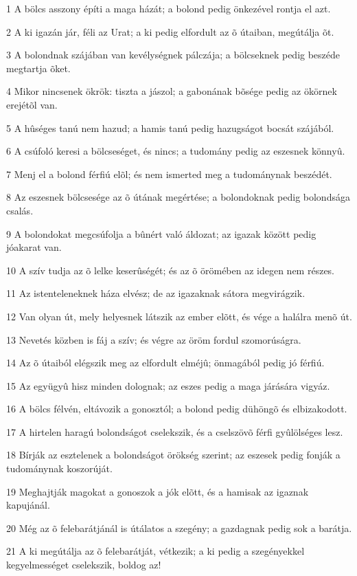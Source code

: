 \par 1 A bölcs asszony építi a maga házát; a bolond pedig önkezével rontja el azt.
\par 2 A ki igazán jár, féli az Urat; a ki pedig elfordult az õ útaiban, megútálja õt.
\par 3 A bolondnak szájában van kevélységnek pálczája; a bölcseknek pedig beszéde megtartja õket.
\par 4 Mikor nincsenek ökrök: tiszta a jászol; a gabonának bõsége pedig az ökörnek erejétõl van.
\par 5 A hûséges tanú nem hazud; a hamis tanú pedig hazugságot bocsát szájából.
\par 6 A csúfoló keresi a bölcseséget, és nincs; a tudomány pedig az eszesnek könnyû.
\par 7 Menj el a bolond férfiú elõl; és nem ismerted meg a tudománynak beszédét.
\par 8 Az eszesnek bölcsesége az õ útának megértése; a bolondoknak pedig bolondsága csalás.
\par 9 A bolondokat megcsúfolja a bûnért való áldozat; az igazak között pedig jóakarat van.
\par 10 A szív tudja az õ lelke keserûségét; és az õ örömében az idegen nem részes.
\par 11 Az istenteleneknek háza elvész; de az igazaknak sátora megvirágzik.
\par 12 Van olyan út, mely helyesnek látszik az ember elõtt, és vége a halálra menõ út.
\par 13 Nevetés közben is fáj a szív; és végre az öröm fordul szomorúságra.
\par 14 Az õ útaiból elégszik meg az elfordult elméjû; önmagából pedig jó férfiú.
\par 15 Az együgyû hisz minden dolognak; az eszes pedig a maga járására vigyáz.
\par 16 A bölcs félvén, eltávozik a gonosztól; a bolond pedig dühöngõ és elbizakodott.
\par 17 A hirtelen haragú bolondságot cselekszik, és a cselszövõ férfi gyûlölséges lesz.
\par 18 Bírják az esztelenek a bolondságot örökség szerint; az eszesek pedig fonják a tudománynak koszorúját.
\par 19 Meghajtják magokat a gonoszok a jók elõtt, és a hamisak az igaznak kapujánál.
\par 20 Még az õ felebarátjánál is útálatos a szegény; a gazdagnak pedig sok a barátja.
\par 21 A ki megútálja az õ felebarátját, vétkezik; a ki pedig a szegényekkel kegyelmességet cselekszik,  boldog az!

